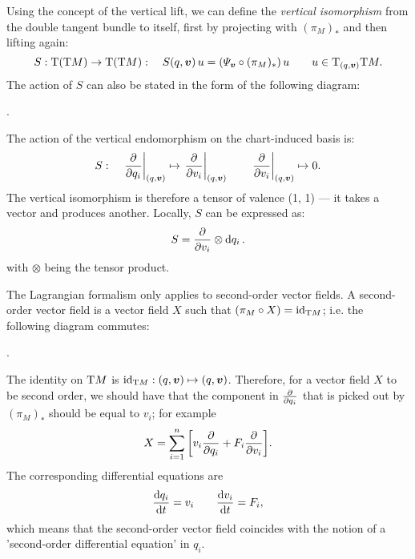Using the concept of the vertical lift, we can define the \emph{vertical isomorphism} from the double tangent bundle to itself, first by projecting with $(\pi_M)_*$ and then lifting again:
$$ S: \tbundle{\qty(\tbundle{M})} \to \tbundle{\qty(\tbundle{M})}: \quad S(q, \vec{v})\,u = \qty(\Psi_{\vec{v}} \circ (\pi_M)_*)\,u \qquad u \in \tspace{(q, \vec{v})}{\tbundle{M}}.  $$
The action of $S$ can also be stated in the form of the following diagram:
\begin{center}
   .
\end{center}
The action of the vertical endomorphism on the chart-induced basis is:
$$ S: \quad \left. \pdv{}{q_i}\right|_{(q, \vec{v})} \mapsto \left.\pdv{}{v_i}\right|_{(q, \vec{v})} \qquad  \left. \pdv{}{v_i}\right|_{(q, \vec{v})} \mapsto 0. $$
The vertical isomorphism is therefore a tensor of valence (1, 1) --- it takes a vector and produces another. Locally, $S$ can be expressed as:
$$ S = \pdv{}{v_i}\otimes \dd{q_i}. $$
with $\otimes$ being the tensor product. \cite{Carinena1990}

The Lagrangian formalism only applies to second-order vector fields. A second-order vector field is a vector field $X$ such that $(\pi_M \circ X) = \mathrm{id}_{\mathrm{T}M}$; i.e. the following diagram commutes: \cite{Abraham1978}
\begin{center}
   .
\end{center}
The identity on $\mathrm{T}M$ is $\mathrm{id}_{\tbundle{M}}: (q, \vec{v}) \mapsto (q, \vec{v})$. Therefore, for a vector field $X$ to be second order, we should have that the component in $\pdv{}{q_i}$ that is picked out by $(\pi_M)_*$ should be equal to $v_i$; for example
$$ X = \sum_{i=1}^n \qty[v_i \pdv{q_i} + F_i\pdv{v_i}]. $$
The corresponding differential equations are
$$ \dv{q_i}{t} = v_i \qquad \dv{v_i}{t} = F_i, $$
which means that the second-order vector field coincides with the notion of a 'second-order differential equation' in $q_i$.

